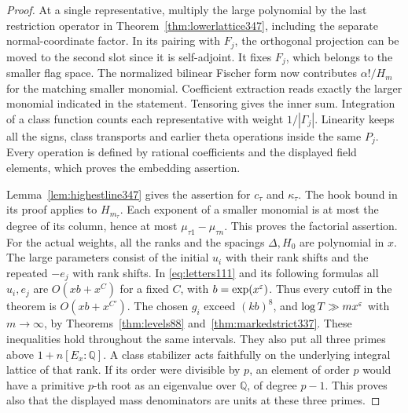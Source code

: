 \documentclass[a4paper,11pt]{article}
\theoremstyle{definition}
\theoremstyle{remark}
\numberwithin{equation}{section}
\begin{document}
\begin{proof}
At a single representative, multiply the large polynomial by the
last restriction operator in Theorem~\ref{thm:lowerlattice347},
including the separate normal-coordinate factor. In its pairing
with \(F_j\), the orthogonal projection can be moved to the second
slot since it is self-adjoint. It fixes \(F_j\), which belongs to
the smaller flag space. The normalized bilinear Fischer form now
contributes \(\alpha!/H_m\) for the matching smaller monomial.
Coefficient extraction reads exactly the larger monomial indicated
in the statement. Tensoring gives the inner sum. Integration of a
class function counts each representative with weight
\(1/|\Gamma_j|\). Linearity keeps all the signs, class transports
and earlier theta operations inside the same \(P_j\). Every
operation is defined by rational coefficients and the displayed
field elements, which proves the embedding assertion.

Lemma~\ref{lem:highestline347} gives the assertion for \(c_\tau\)
and \(\kappa_\tau\). The hook bound in its proof applies to
\(H_{m_\tau}\). Each exponent of a smaller monomial is at most
the degree of its column, hence at most \(\mu_{\tau1}-\mu_{\tau n}\).
This proves the factorial assertion. For the actual weights, all
the ranks and the spacings \(\Delta,H_0\) are polynomial in \(x\).
The large parameters consist of the initial \(u_i\) with their
rank shifts and the repeated \(-e_j\) with rank shifts. In
\eqref{eq:letters111} and its following formulas all \(u_i,e_j\)
are \(O(xb+x^C)\) for a fixed \(C\), with \(b=\exp(x^\varepsilon)\).
Thus every cutoff in the theorem is \(O(xb+x^{C'})\).
The chosen \(g_i\) exceed \((kb)^8\), and \(\log T\gg m x^\varepsilon\)
with \(m\to\infty\), by Theorems~\ref{thm:levels88}
and~\ref{thm:markedstrict337}. These inequalities hold throughout
the same intervals. They also put all three primes above
\(1+n[E_x:\mathbb Q]\). A class stabilizer acts faithfully on the
underlying integral lattice of that rank. If its order were divisible
by \(p\), an element of order \(p\) would have a primitive
\(p\)-th root as an eigenvalue over \(\mathbb Q\), of degree
\(p-1\). This proves also that the displayed mass denominators
are units at these three primes.
\end{proof}
\end{document}
